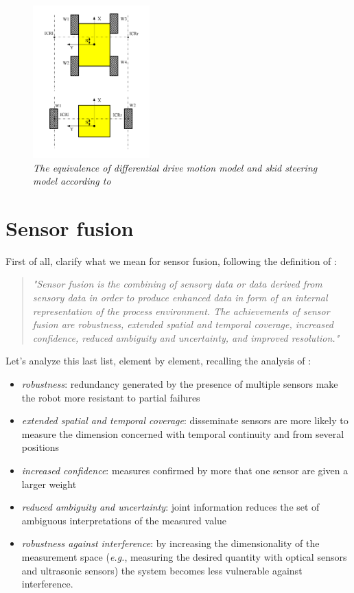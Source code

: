 \begin{figure}
	\centering
	\includegraphics[width=0.4\textwidth]{Images/background_and_tools/diffSkidEquivalence.png}
	\caption{\textit{The equivalence of differential drive motion model and skid steering model according to \cite{skid2diff}}}
	\label{fig:diffSkidEquivalence}
\end{figure}

\section{Sensor fusion}\label{sec:sensorFusion}

First of all, clarify what we mean for sensor fusion, following the definition of  \cite{sensorFusionDef}:
\blockquote{\textit{
"Sensor fusion is the combining of sensory data or data derived from sensory
data in order to produce enhanced data in form of an internal representation
of the process environment. The achievements of sensor fusion are
robustness, extended spatial and temporal coverage, increased confidence,
reduced ambiguity and uncertainty, and improved resolution."}}
Let's analyze this last list, element by element, recalling the analysis of \cite{sensorFusionAdvantages}:
\begin{itemize}
	\item \textit{robustness}: redundancy generated by the presence of multiple sensors make the robot more resistant to partial failures
	\item \textit{extended spatial and temporal coverage}: disseminate sensors are more likely to measure the dimension concerned with temporal continuity and from several positions
	\item \textit{increased confidence}: measures confirmed by more that one sensor are given a larger weight
	\item \textit{reduced ambiguity and uncertainty}: joint information reduces the set
of ambiguous interpretations of the measured value
	\item \textit{robustness against interference}:  by increasing the dimensionality of
the measurement space (\textit{e.g.}, measuring the desired quantity with optical sensors and ultrasonic sensors) the system becomes less vulnerable
against interference.
\end{itemize}

